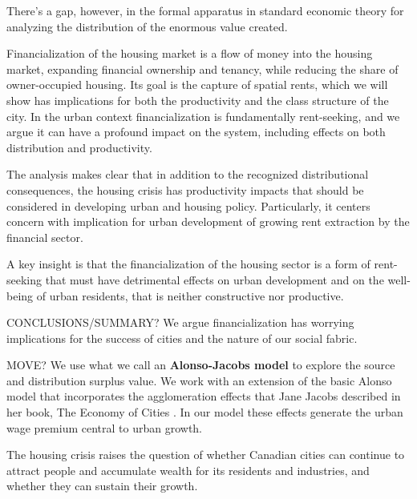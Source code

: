 There's a gap, however, in the formal apparatus in standard economic theory for analyzing the distribution of the enormous value created. 


Financialization of the housing market is a flow of money into the housing market, expanding financial ownership and tenancy, while reducing the share of owner-occupied housing. Its goal is the capture of spatial rents, which we will show has implications for both the productivity and the class structure of the city. 
In the urban context financialization is fundamentally \gls{rent-seeking}, and we argue it can have a profound impact on the system, including effects on both distribution and productivity. 

The analysis makes clear that in addition to the recognized distributional consequences, the housing crisis has productivity impacts that should be considered in developing urban and housing policy. Particularly, it centers concern with implication for urban development of growing rent extraction by the financial sector. 

A key insight is that the financialization of the housing sector is a form of \gls{rent-seeking} that must have detrimental effects on urban development and on the well-being of urban residents, that is neither constructive nor productive.

CONCLUSIONS/SUMMARY?
We argue financialization %
has worrying implications for the success of cities and the nature of our social fabric. 

MOVE? We use what we call an \textbf{\gls{Alonso-Jacobs model}} to explore the source and distribution surplus value. We  work with an extension of the basic Alonso model that incorporates the \gls{agglomeration effects} that Jane Jacobs  described in her book, The Economy of Cities \cite{jacobsEconomyCities1969}. In our model these effects generate the \gls{urban wage premium} central to urban growth. %

The housing crisis raises the question of whether Canadian cities can continue to attract people and accumulate wealth for its residents and industries, and whether they can sustain their growth.




